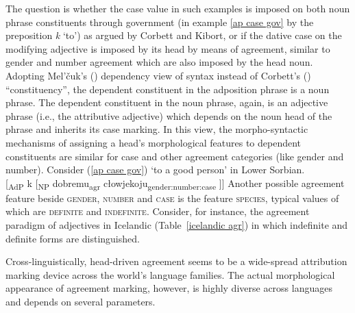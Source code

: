 The question is whether the case value in such examples is imposed on both noun phrase constituents through government (in example \ref{ap case gov} by the preposition \textit{k} ‘to’) as argued by Corbett and Kibort, or if the dative case on the modifying adjective is imposed by its head by means of agreement, similar to gender and number agreement which are also imposed by the head noun. Adopting Mel'čuk's (\citeyear[329, 337]{melcuk1993}) dependency view of syntax instead of Corbett's (\citeyear[133]{corbett2006}) “constituency”, the dependent constituent in the adposition phrase is a noun phrase. The dependent constituent in the noun phrase, again, is an adjective phrase (i.e., the attributive adjective) which depends on the noun head of the phrase and inherits its case marking. In this view, the morpho-syntactic mechanisms of assigning a head's morphological features to dependent constituents are similar for case and other agreement categories (like gender and number). Consider (\ref{ap case gov}) ‘to a good person’ in Lower Sorbian.
\ea
{}\\
{\upshape [}\textsubscript{\rm AdP} k {\upshape [}\textsubscript{\rm NP} dobremu\textsubscript{\rm agr} cłowjekoju\textsubscript{\rm gender:number:case} {\upshape ]]}
\z
Another possible agreement feature beside \textsc{gender, number} and \textsc{case} is the feature \textsc{species}, typical values of which are \textsc{definite} and \textsc{indefinite}. Consider, for instance, the agreement paradigm of adjectives in Icelandic (Table~\ref{icelandic agr}) in which indefinite and definite forms are distinguished.

Cross-linguistically, head\hyp{}driven agreement seems to be a wide-spread attribution marking device across the world's language families. The actual morphological appearance of agreement marking, however, is highly diverse across languages and depends on several parameters.

